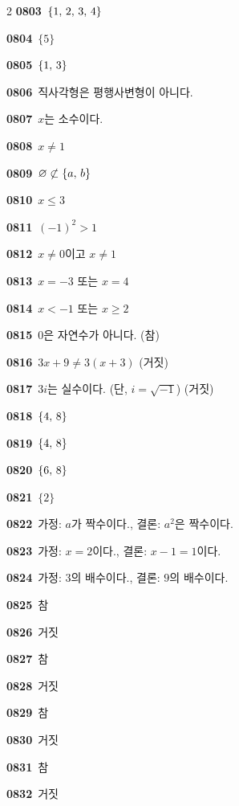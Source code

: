 \documentclass[10pt,a4paper]{article}
\begin{document}
\begin{multicols}{2}
\noindent\textbf{0803}\ $\{1,\mkern3mu 2,\mkern3mu 3,\mkern3mu 4\}$\par
\noindent\textbf{0804}\ $\{5\}$\par
\noindent\textbf{0805}\ $\{1,\mkern3mu 3\}$\par
\noindent\textbf{0806}\ 직사각형은 평행사변형이 아니다.\par
\noindent\textbf{0807}\ $x$는 소수이다.\par
\noindent\textbf{0808}\ $x\ne 1$\par
\noindent\textbf{0809}\ $\varnothing\not\subset\{a,\mkern3mu b\}$\par
\noindent\textbf{0810}\ $x\le 3$\par
\noindent\textbf{0811}\ $(-1)^2>1$\par
\noindent\textbf{0812}\ $x\ne 0$이고 $x\ne 1$\par
\noindent\textbf{0813}\ $x=-3$ 또는 $x=4$\par
\noindent\textbf{0814}\ $x<-1$ 또는 $x\ge 2$\par
\noindent\textbf{0815}\ $0$은 자연수가 아니다. (참)\par
\noindent\textbf{0816}\ $3x+9\ne 3(x+3)$ (거짓)\par
\noindent\textbf{0817}\ $3i$는 실수이다. (단, $i=\sqrt{-1}$) (거짓)\par
\noindent\textbf{0818}\ $\{4,\mkern3mu 8\}$\par
\noindent\textbf{0819}\ $\{4,\mkern3mu 8\}$\par
\noindent\textbf{0820}\ $\{6,\mkern3mu 8\}$\par
\noindent\textbf{0821}\ $\{2\}$\par
\noindent\textbf{0822}\ 가정: $a$가 짝수이다., 결론: $a^2$은 짝수이다.\par
\noindent\textbf{0823}\ 가정: $x=2$이다., 결론: $x-1=1$이다.\par
\noindent\textbf{0824}\ 가정: $3$의 배수이다., 결론: $9$의 배수이다.\par
\noindent\textbf{0825}\ 참\par
\noindent\textbf{0826}\ 거짓\par
\noindent\textbf{0827}\ 참\par
\noindent\textbf{0828}\ 거짓\par
\noindent\textbf{0829}\ 참\par
\noindent\textbf{0830}\ 거짓\par
\noindent\textbf{0831}\ 참\par
\noindent\textbf{0832}\ 거짓\par

\end{multicols}
\end{document}

